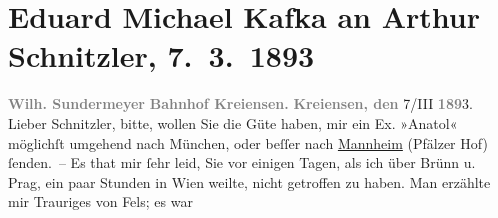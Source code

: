 

         
         \renewcommand{\erwaehntePersonen}{Personen: Friedrich Michael Fels, Wilhelm Sundermeyer}
         \renewcommand{\erwaehnteOrte}{Orte: Bahnhof, Brünn, Kreiensen, Mannheim, München, Norwegen, Pfälzer Hof, Prag, Schweden, Wien}
         \renewcommand{\erwaehnteWerke}{Werke: Anatol}
               \section[Eduard Michael Kafka an Arthur Schnitzler, 7. 3. 1893]{ Eduard Michael Kafka an Arthur Schnitzler, 7. 3. 1893}\nopagebreak{}\rehead{ }\begin{ledgroupsized}[t]{13cm}\normalsize\beginnumbering \toendnotes[C]{\smallbreak\pagebreak[2]} 
\pstart
           \noindent{}\centering{}{\pb}\textcolor{gray}{\textbf{Wilh. Sundermeyer}}\pend
           \pstart
           \noindent{}\centering{}\textcolor{gray}{\textbf{Bahnhof Kreiensen.}}\pend
           \pstart
           \raggedleft{}\textcolor{gray}{\textbf{Kreiensen, den }}7/III \textcolor{gray}{\textbf{189}}3.\pend
           \pstart{}Lieber Schnitzler,\pend\pstart
           bitte, wollen Sie die Güte haben, mir ein Ex. »Anatol« möglichſt umgehend nach München, oder beſſer nach \uline{Mannheim} (Pfälzer Hof) ſenden. –\pend
           \pstart
           Es that mir ſehr leid, Sie vor einigen Tagen, als ich über Brünn u. Prag, ein paar
                    Stunden in Wien weilte, nicht getroffen zu
                    haben.\pend
           \pstart
           Man erzählte mir Trauriges von Fels; es war

\end{ledgroupsized}
